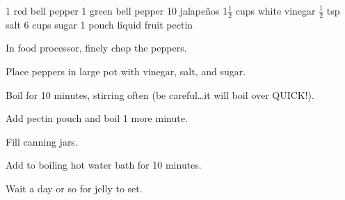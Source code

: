 \dishtype{\preserve}
\dishother{\vegetarian}
\begin{ingreds}
    1 red bell pepper
    1 green bell pepper
    10 jalape\~nos
    1$\frac{1}{2}$ cups white vinegar
    $\frac{1}{2}$ tsp salt
    6 cups sugar
    1 pouch liquid fruit pectin   
\end{ingreds}
\begin{method}
    In food processor, finely chop the peppers.\par
    Place peppers in large pot with vinegar, salt, and sugar.\par
    Boil for 10 minutes, stirring often (be careful…it will boil over QUICK!).\par
    Add pectin pouch and boil 1 more minute.\par
    Fill canning jars.\par
    Add to boiling hot water bath for 10 minutes.\par
    Wait a day or so for jelly to set.
\end{method}